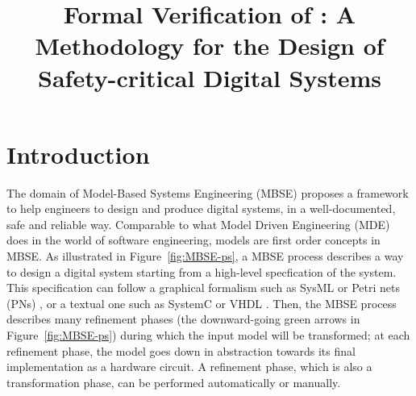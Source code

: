 \documentclass[pdflatex,sn-mathphys]{sn-jnl}%
\theoremstyle{thmstyleone}%
\theoremstyle{thmstyletwo}%
\theoremstyle{thmstylethree}%
\begin{document}
\title[Formal Verification of the \hilecop{} Methodology]{Formal
  Verification of \hilecop{}: A Methodology for the Design of
  Safety-critical Digital Systems}


\author*[1]{ }
\author[1]{ }
\author[2]{ }




\abstract{}

\keywords{}

\maketitle

\section{Introduction}
\label{sec:intro}

The domain of Model-Based Systems Engineering (MBSE) \cite{Long2011}
proposes a framework to help engineers to design and produce digital
systems, in a well-documented, safe and reliable way. Comparable to
what Model Driven Engineering (MDE) does in the world of software
engineering, models are first order concepts in MBSE.  As illustrated
in Figure~\ref{fig:MBSE-ps}, a MBSE process describes a way to design
a digital system starting from a high-level specfication of the
system. This specification can follow a graphical formalism such as
SysML \cite{Friedenthal2014} or Petri nets (PNs) \cite{Petri1962}, or
a textual one such as SystemC \cite{Black2009} or VHDL
\cite{Ashenden2010}. Then, the MBSE process describes many refinement
phases (the downward-going green arrows in Figure~\ref{fig:MBSE-ps})
during which the input model will be transformed; at each refinement
phase, the model goes down in abstraction towards its final
implementation as a hardware circuit. A refinement phase, which is
also a transformation phase, can be performed automatically or
manually.
\end{document}
